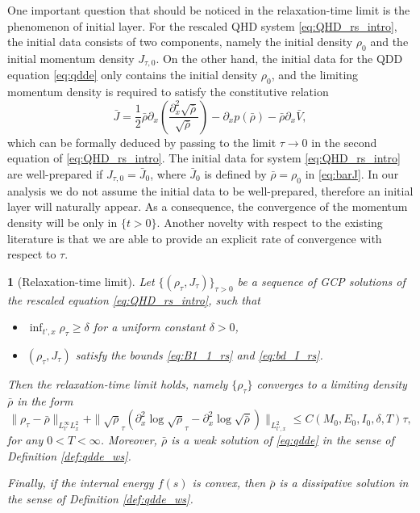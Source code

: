 \documentclass[leqno]{amsart}
\theoremstyle{plain}
\newtheorem{thm}{\protect\theoremname}
\theoremstyle{definition}
\theoremstyle{remark}
\theoremstyle{plain}
\theoremstyle{plain}
\providecommand{\theoremname}{Theorem}
\def\d{{\partial}}
\numberwithin{equation}{section}
\begin{document}
One important question that should be noticed in the relaxation-time limit is the phenomenon of initial layer. For the rescaled QHD system \eqref{eq:QHD_rs_intro}, the initial data consists of two components, namely the initial density $\rho_0$ and the initial momentum density $J_{\tau,0}$. On the other hand, the initial data for the QDD equation \eqref{eq:qdde} only contains the initial density $\rho_0$, and the limiting momentum density is required to satisfy the constitutive relation
\begin{equation}\label{eq:barJ}
\bar{J}=\frac{1}{2}\bar\rho\d_x\left(\frac{\d_x^2\sqrt{\bar\rho}}{\sqrt{\bar\rho}}\right)-\d_x p(\bar\rho)-\bar\rho\d_x\bar{V},
\end{equation}
which can be formally deduced by passing to the limit $\tau\to 0$ in the second equation of \eqref{eq:QHD_rs_intro}. 
The initial data for system \eqref{eq:QHD_rs_intro} are  well-prepared if $J_{\tau, 0}=\bar J_0$, where $\bar J_0$ is defined by $\bar\rho=\rho_0$ in \eqref{eq:barJ}.
In our analysis we do not assume the initial data to be well-prepared, therefore an initial layer will naturally appear. As a consequence, the convergence of the momentum density will be only in $\{t>0\}$.
\newline
Another novelty with respect to the existing literature is that we are able to provide an explicit rate of convergence with respect to $\tau$.


\begin{thm}[Relaxation-time limit]\label{thm:rlxlimit}
Let $\{(\rho_{\tau},J_{\tau})\}_{\tau>0}$ be a sequence of GCP solutions of the rescaled equation \eqref{eq:QHD_rs_intro}, such that
\begin{itemize}
\item $\inf_{t’,x}\rho_{\tau}\geq \delta$ for a uniform constant $\delta>0$,
\item $(\rho_{\tau},J_{\tau})$ satisfy the bounds \eqref{eq:B1_1_rs} and \eqref{eq:bd_I_rs}.
\end{itemize}
Then the relaxation-time limit holds, namely $\{\rho_{\tau}\}$ converges to a limiting density $\bar\rho$ in the form
\[
\|\rho_\tau-\bar\rho\|_{L^\infty_{t'}L^2_x}+\|\sqrt\rho_\tau (\d_x^2\log\sqrt\rho_\tau-\d_x^2\log\sqrt{\bar\rho})\|_{L^2_{t',x}}\leq C(M_0,E_0,I_0,\delta,T)\tau,
\]
for any $0<T<\infty$. Moreover, $\bar\rho$ is a weak solution of \eqref{eq:qdde} in the sense of Definition \ref{def:qdde_ws}. 

Finally, if the internal energy $f(s)$ is convex, then $\bar\rho$ is a dissipative solution in the sense of Definition \ref{def:qdde_ws}.


\end{thm}
\end{document}
